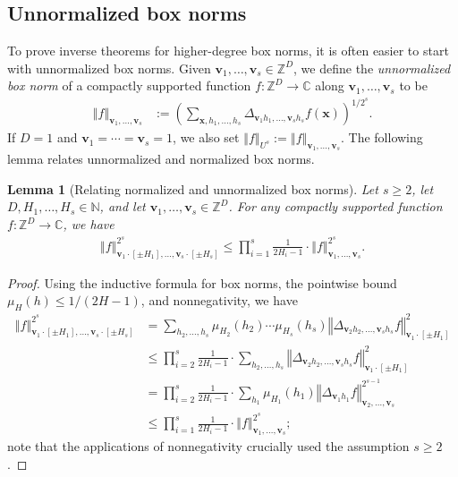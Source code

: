 \documentclass[11pt]{amsart}
\newtheorem{lemma}{Lemma}[section]
\theoremstyle{definition}
\newcommand{\C}{{\mathbb C}}
\newcommand{\N}{{\mathbb N}}
\newcommand{\Z}{{\mathbb Z}}
\newcommand{\bv}{{\textbf{v}}}
\newcommand{\bx}{{\textbf{x}}}
\newcommand{\norm}[1]{\left\Vert #1\right\Vert}
\newcommand{\brac}[1]{\mathopen{}\left( #1 \mathclose{}\right)}
\begin{document}
\subsection{Unnormalized box norms}
To prove inverse theorems for higher-degree box norms, it is often easier to start with unnormalized box norms. Given $\bv_1, \ldots, \bv_s\in\Z^D$, we define the \emph{unnormalized box norm} of a compactly supported function $f:\Z^D\to\C$ along $\bv_1, \ldots, \bv_s$ to be
    \begin{align*}
                \norm{f}_{\bv_1,\ldots, \bv_s}&:= \brac{\sum_{\bx, h_1, \ldots, h_s}\Delta_{\bv_1 h_1, \ldots, \bv_s h_s} f(\bx)}^{1/2^s}.
    \end{align*}
    If $D=1$ and $\bv_1 = \cdots = \bv_s=1$, we also set $\norm{f}_{U^s} := \norm{f}_{\bv_1, \ldots, \bv_s}$.
    The following lemma relates unnormalized and normalized box norms. 
    \begin{lemma}[Relating normalized and unnormalized box norms]\label{L: normalized vs. unnormalized}
        Let $s\geq 2$, let $D, H_1, \ldots, H_s\in\N$, and let $\bv_1, \ldots, \bv_s\in\Z^D$.  For any compactly supported function $f:\Z^D\to\C$, we have
            \begin{align*}
                \norm{f}_{\bv_1\cdot[\pm H_1],\ldots, \bv_s\cdot[\pm H_s]}^{2^s}\leq \prod_{i=1}^s \frac{1}{2H_i-1} \cdot\norm{f}_{\bv_1, \ldots, \bv_s}^{2^{s}}.
            \end{align*}
    \end{lemma}
\begin{proof}
Using the inductive formula for box norms, the pointwise bound $\mu_{H}(h) \leq 1/(2H-1)$, and nonnegativity, we have
\begin{align*}
\norm{f}_{\bv_1\cdot[\pm H_1],\ldots, \bv_s\cdot[\pm H_s]}^{2^s} &= \sum_{h_2, \ldots, h_s}\mu_{H_2}(h_2) \cdots \mu_{H_s}(h_s)\norm{\Delta_{\bv_2 h_2, \ldots, \bv_s h_s} f}_{\bv_1\cdot[\pm H_1]}^2\\
&\leq \prod_{i=2}^s \frac{1}{2H_i-1} \cdot\sum_{h_2, \ldots, h_s}\norm{\Delta_{\bv_2 h_2, \ldots, \bv_s h_s} f}_{\bv_1\cdot[\pm H_1]}^{2}\\
 &=\prod_{i=2}^s \frac{1}{2H_i-1} \cdot \sum_{h_1} \mu_{H_1}(h_1)\norm{\Delta_{\bv_1 h_1}f}_{\bv_2, \ldots, \bv_s}^{2^{s-1}}\\
 & \leq \prod_{i=1}^s \frac{1}{2H_i-1} \cdot \norm{f}_{\bv_1, \ldots, \bv_s}^{2^{s}};
\end{align*}
note that the applications of nonnegativity crucially used the assumption $s \geq 2$.
\end{proof}
\end{document}
